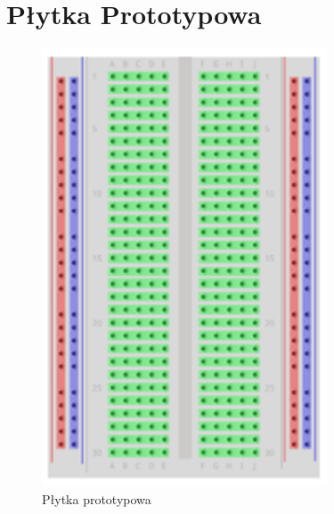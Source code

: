 \section{Płytka Prototypowa}
\begin{figure}[htbp]
	\centering
	\includegraphics[width=0.5\linewidth, height=13cm]{"obrazy/Breadboard"}
	\caption{Płytka prototypowa}
	\label{fig:3}
\end{figure}
